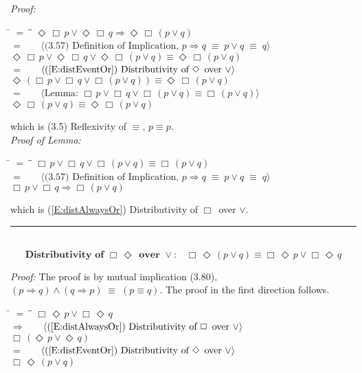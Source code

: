 \documentclass[fleqn, leqno]{article}
\newcommand{\lgap}{2pt}                             %
\newcommand{\mymathindent}{24pt}                    %
\newcommand{\equivs}{\ensuremath{\;\equiv\;}}       %
\newcommand{\impl}{\ensuremath{\Rightarrow}}        %
\newcommand{\Event}{\Diamond\,}
\newcommand{\Always}{\Box\,}
\newcommand{\myqed}{\rule[-.23ex]{1.2ex}{2.0ex}}
\newcommand{\myqedtab}{\hspace{388.5pt}}              %
\newcommand{\Gll} {\langle}                         %
\newcommand{\Ggg} {\rangle}                         %
\newcommand{\Hint}[1]     {\ \ \ $\Gll              \mbox{#1} \Ggg$ }   %
\begin{document}
\emph{Proof:}
\begin{tabbing}
\hspace{\mymathindent} \= $= \;$ \= \myqedtab \= \kill
  \> \>   $\Event\Always p \lor \Event\Always q \impl \Event\Always(p \lor q)$\\[\lgap]
  \> $=$  \>  \Hint{(3.57) Definition of Implication, $p\impl q \equivs p\lor q \equivs q$}\\[\lgap]
  \> \>   $\Event\Always p \lor \Event\Always q \lor \Event\Always(p \lor q) \equiv \Event\Always(p \lor q)$\\[\lgap]
  \> $=$  \>  \Hint{(\ref{E:distEventOr}) Distributivity of $\Event$ over $\lor$}\\[\lgap]
  \> \>   $\Event(\Always p \lor \Always q \lor \Always(p \lor q)) \equiv \Event\Always(p \lor q)$\\[\lgap]
  \> $=$  \>  \Hint{Lemma: $\Always p \lor \Always q \lor \Always(p \lor q) \equiv \Always(p \lor q)$}\\[\lgap]
  \> \>   $\Event\Always(p \lor q) \equiv \Event\Always(p \lor q)$
\end{tabbing}
which is (3.5) Reflexivity of $\equiv$, $p\equiv p$.\\[\lgap]

\emph{Proof of Lemma:}
\begin{tabbing}
\hspace{\mymathindent} \= $= \;$ \= \myqedtab \= \kill
  \> \>   $\Always p \lor \Always q \lor \Always(p \lor q) \equiv \Always(p \lor q)$\\[\lgap]
  \> $=$  \>  \Hint{(3.57) Definition of Implication, $p\impl q \equivs p\lor q \equivs q$}\\[\lgap]
  \> \>   $\Always p \lor \Always q \impl \Always(p \lor q)$
\end{tabbing}
which is (\ref{E:distAlwaysOr}) Distributivity of $\Always$ over $\lor$. \hfill \myqed\\[\lgap]

\begin{equation}\label{E:distAlwaysEventOr}
\textbf{Distributivity of $\Always\Event$ over $\lor$:}\quad \Always\Event(p \lor q) \equiv \Always\Event p \lor \Always\Event q
\end{equation}

\emph{Proof:} The proof is by mutual implication (3.80), $(p\impl q) \land (q\impl p) \equivs (p\equiv q)$.
The proof in the first direction follows.
\begin{tabbing}
\hspace{\mymathindent} \= $= \;$ \= \myqedtab \= \kill
  \> \>   $\Always\Event p \lor \Always\Event q$\\[\lgap]
  \> $\impl$  \>  \Hint{(\ref{E:distAlwaysOr}) Distributivity of $\Always$ over $\lor$}\\[\lgap]
  \> \>   $\Always(\Event p \lor \Event q)$\\[\lgap]
  \> $=$  \>  \Hint{(\ref{E:distEventOr}) Distributivity of $\Event$ over $\lor$}\\[\lgap]
  \> \>   $\Always\Event(p \lor q)$\\[\lgap]
\end{tabbing}
\end{document}
